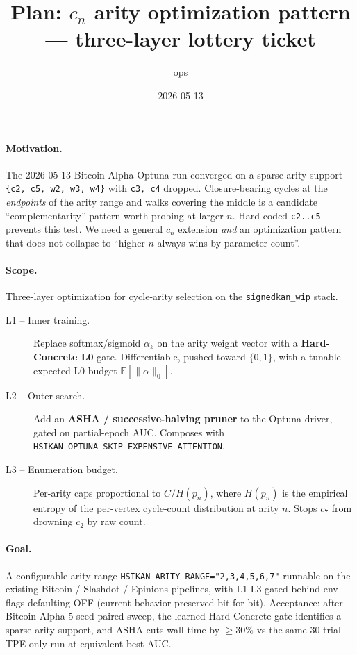 \documentclass{article}
\title{Plan: $c_n$ arity optimization pattern --- three-layer lottery ticket}
\author{ops}
\date{2026-05-13}
\begin{document}
\maketitle

\paragraph{Motivation.}
The 2026-05-13 Bitcoin Alpha Optuna run converged on a sparse arity
support \texttt{\{c2, c5, w2, w3, w4\}} with \texttt{c3, c4} dropped.
Closure-bearing cycles at the \emph{endpoints} of the arity range and
walks covering the middle is a candidate ``complementarity'' pattern
worth probing at larger $n$.  Hard-coded \texttt{c2..c5} prevents this
test.  We need a general $c_n$ extension \emph{and} an optimization
pattern that does not collapse to ``higher $n$ always wins by
parameter count''.

\paragraph{Scope.}
Three-layer optimization for cycle-arity selection on the
\texttt{signedkan\_wip} stack.
\begin{description}
  \item[L1 -- Inner training.] Replace softmax/sigmoid $\alpha_k$ on
  the arity weight vector with a \textbf{Hard-Concrete L0} gate.
  Differentiable, pushed toward $\{0,1\}$, with a tunable expected-L0
  budget $\mathbb{E}[\|\alpha\|_0]$.
  \item[L2 -- Outer search.] Add an \textbf{ASHA / successive-halving
  pruner} to the Optuna driver, gated on partial-epoch AUC.
  Composes with \texttt{HSIKAN\_OPTUNA\_SKIP\_EXPENSIVE\_ATTENTION}.
  \item[L3 -- Enumeration budget.] Per-arity caps proportional to
  $C / H(p_n)$, where $H(p_n)$ is the empirical entropy of the
  per-vertex cycle-count distribution at arity $n$.  Stops $c_7$ from
  drowning $c_2$ by raw count.
\end{description}

\paragraph{Goal.}
A configurable arity range \texttt{HSIKAN\_ARITY\_RANGE="2,3,4,5,6,7"}
runnable on the existing Bitcoin / Slashdot / Epinions pipelines,
with L1-L3 gated behind env flags defaulting OFF (current behavior
preserved bit-for-bit).  Acceptance: after Bitcoin Alpha 5-seed paired
sweep, the learned Hard-Concrete gate identifies a sparse arity
support, and ASHA cuts wall time by $\geq 30\%$ vs the same 30-trial
TPE-only run at equivalent best AUC.
\end{document}
